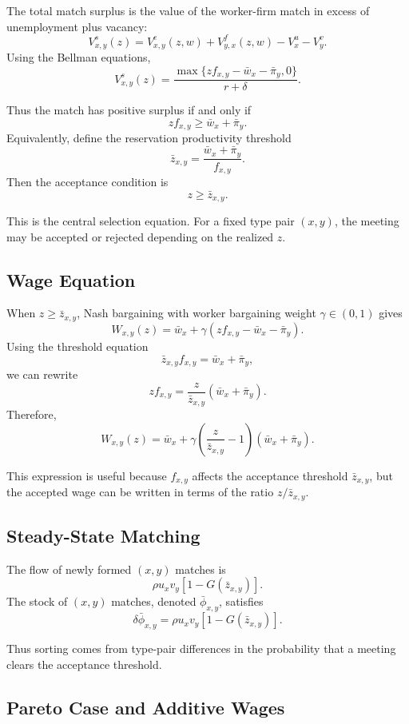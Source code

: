 \documentclass[11pt]{article}
\newcommand{\1}{\mathbf{1}}
\begin{document}
The total match surplus is the value of the worker-firm match in excess of unemployment plus vacancy:
\[
V^s_{x,y}(z)
=
V^e_{x,y}(z,w)+V^f_{y,x}(z,w)-V_x^u-V_y^v.
\]
Using the Bellman equations,
\[
V^s_{x,y}(z)
=
\frac{\max\{z f_{x,y}-\bar w_x-\bar \pi_y,0\}}{r+\delta}.
\]

Thus the match has positive surplus if and only if
\[
z f_{x,y}\geq \bar w_x+\bar \pi_y.
\]
Equivalently, define the reservation productivity threshold
\[
\bar z_{x,y}
=
\frac{\bar w_x+\bar \pi_y}{f_{x,y}}.
\]
Then the acceptance condition is
\[
\boxed{z\geq \bar z_{x,y}.}
\]

This is the central selection equation. For a fixed type pair $(x,y)$, the meeting may be accepted or rejected depending on the realized $z$.

\subsection{Wage Equation}

When $z\geq \bar z_{x,y}$, Nash bargaining with worker bargaining weight $\gamma\in(0,1)$ gives
\[
W_{x,y}(z)
=
\bar w_x+\gamma\left(zf_{x,y}-\bar w_x-\bar \pi_y\right).
\]
Using the threshold equation
\[
\bar z_{x,y} f_{x,y}=\bar w_x+\bar \pi_y,
\]
we can rewrite
\[
z f_{x,y}
=
\frac{z}{\bar z_{x,y}}(\bar w_x+\bar \pi_y).
\]
Therefore,
\[
W_{x,y}(z)
=
\bar w_x
+\gamma
\left(
\frac{z}{\bar z_{x,y}}-1
\right)
(\bar w_x+\bar \pi_y).
\]

This expression is useful because $f_{x,y}$ affects the acceptance threshold $\bar z_{x,y}$, but the accepted wage can be written in terms of the ratio $z/\bar z_{x,y}$.

\subsection{Steady-State Matching}

The flow of newly formed $(x,y)$ matches is
\[
\rho u_x v_y\left[1-G(\bar z_{x,y})\right].
\]
The stock of $(x,y)$ matches, denoted $\bar \phi_{x,y}$, satisfies
\[
\boxed{
\delta \bar \phi_{x,y}
=
\rho u_x v_y\left[1-G(\bar z_{x,y})\right].
}
\]

Thus sorting comes from type-pair differences in the probability that a meeting clears the acceptance threshold.

\subsection{Pareto Case and Additive Wages}
\end{document}
